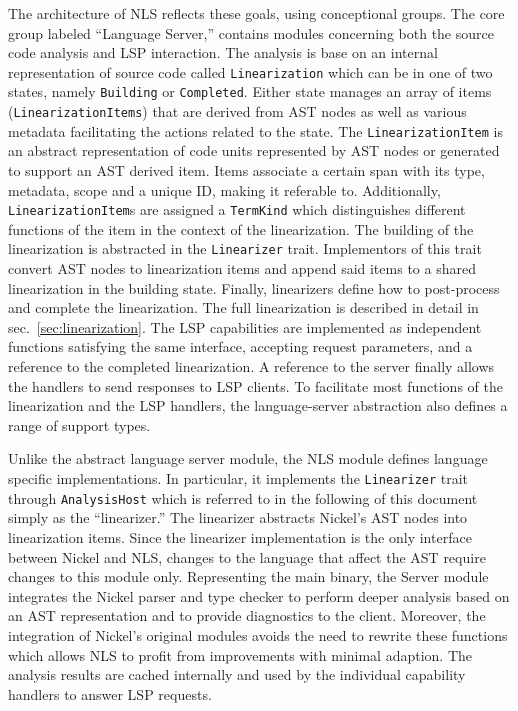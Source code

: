 \documentclass[
  a4paper,
  bibtex,
  english,
  nomenclature]{kthlatex/kththesis/kththesis}
\begin{document}
The architecture of NLS reflects these goals, using conceptional groups.
The core group labeled ``Language Server,'' contains modules concerning
both the source code analysis and LSP interaction. The analysis is base
on an internal representation of source code called
\texttt{Linearization} which can be in one of two states, namely
\texttt{Building} or \texttt{Completed}. Either state manages an array
of items (\texttt{LinearizationItems}) that are derived from AST nodes
as well as various metadata facilitating the actions related to the
state. The \texttt{LinearizationItem} is an abstract representation of
code units represented by AST nodes or generated to support an AST
derived item. Items associate a certain span with its type, metadata,
scope and a unique ID, making it referable to. Additionally,
\texttt{LinearizationItem}s are assigned a \texttt{TermKind} which
distinguishes different functions of the item in the context of the
linearization. The building of the linearization is abstracted in the
\texttt{Linearizer} trait. Implementors of this trait convert AST nodes
to linearization items and append said items to a shared linearization
in the building state. Finally, linearizers define how to post-process
and complete the linearization. The full linearization is described in
detail in sec.~\ref{sec:linearization}. The LSP capabilities are
implemented as independent functions satisfying the same interface,
accepting request parameters, and a reference to the completed
linearization. A reference to the server finally allows the handlers to
send responses to LSP clients. To facilitate most functions of the
linearization and the LSP handlers, the language-server abstraction also
defines a range of support types.

Unlike the abstract language server module, the NLS module defines
language specific implementations. In particular, it implements the
\texttt{Linearizer} trait through \texttt{AnalysisHost} which is
referred to in the following of this document simply as the
``linearizer.'' The linearizer abstracts Nickel's AST nodes into
linearization items. Since the linearizer implementation is the only
interface between Nickel and NLS, changes to the language that affect
the AST require changes to this module only. Representing the main
binary, the Server module integrates the Nickel parser and type checker
to perform deeper analysis based on an AST representation and to provide
diagnostics to the client. Moreover, the integration of Nickel's
original modules avoids the need to rewrite these functions which allows
NLS to profit from improvements with minimal adaption. The analysis
results are cached internally and used by the individual capability
handlers to answer LSP requests.
\end{document}
